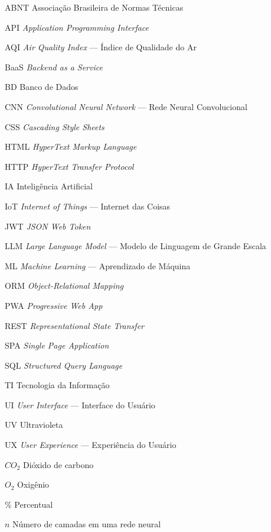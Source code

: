 \documentclass[
	12pt,
	openright,
	oneside,
	a4paper,
	chapter=TITLE,
	section=TITLE,
	subsection=TITLE,
	subsubsection=TITLE,
	english,
	brazil
	]{abntex2}
\begin{document}
\begin{siglas}
  \item[ABNT] Associação Brasileira de Normas Técnicas
  \item[API] \textit{Application Programming Interface}
  \item[AQI] \textit{Air Quality Index} — Índice de Qualidade do Ar
  \item[BaaS] \textit{Backend as a Service}
  \item[BD] Banco de Dados
  \item[CNN] \textit{Convolutional Neural Network} — Rede Neural Convolucional
  \item[CSS] \textit{Cascading Style Sheets}
  \item[HTML] \textit{HyperText Markup Language}
  \item[HTTP] \textit{HyperText Transfer Protocol}
  \item[IA] Inteligência Artificial
  \item[IoT] \textit{Internet of Things} — Internet das Coisas
  \item[JWT] \textit{JSON Web Token}
  \item[LLM] \textit{Large Language Model} — Modelo de Linguagem de Grande Escala
  \item[ML] \textit{Machine Learning} — Aprendizado de Máquina
  \item[ORM] \textit{Object-Relational Mapping}
  \item[PWA] \textit{Progressive Web App}
  \item[REST] \textit{Representational State Transfer}
  \item[SPA] \textit{Single Page Application}
  \item[SQL] \textit{Structured Query Language}
  \item[TI] Tecnologia da Informação
  \item[UI] \textit{User Interface} — Interface do Usuário
  \item[UV] Ultravioleta
  \item[UX] \textit{User Experience} — Experiência do Usuário
\end{siglas}

\begin{simbolos}
  \item[$CO_2$] Dióxido de carbono
  \item[$O_2$] Oxigênio
  \item[$\%$] Percentual
  \item[$n$] Número de camadas em uma rede neural
\end{simbolos}
\end{document}
